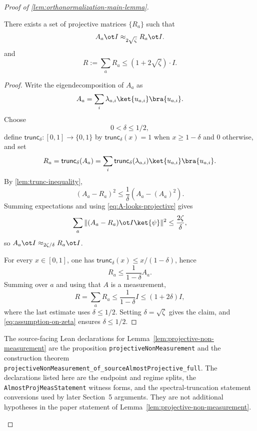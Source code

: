\begin{proof}[Proof of \ref{lem:orthonormalization-main-lemma}]
	\begin{lemma}\label{lem:projective-non-measurement}
		\leanok
		There exists a set of projective matrices $\{R_a\}$ such that
		\begin{equation*}
			A_a \ot I \approx_{2\sqrt{\zeta}} R_a \ot I.
		\end{equation*}
		and
		\begin{equation*}
			R:= \sum_a R_a \leq (1+2\sqrt{\zeta}) \cdot I.
		\end{equation*}
	\end{lemma}
	\begin{proof}
		\leanok
		Write the eigendecomposition of $A_a$ as
		\[
			A_a = \sum_i \lambda_{a,i}\ket{u_{a,i}}\bra{u_{a,i}}.
		\]
		Choose
		\begin{equation}\label{eq:bound-on-delta}
			0 < \delta \leq 1/2,
		\end{equation}
		define $\mathsf{trunc}_\delta:[0,1] \to \{0,1\}$ by $\mathsf{trunc}_\delta(x)=1$ when $x \geq 1-\delta$ and $0$ otherwise, and set
		\[
			R_a = \mathsf{trunc}_\delta(A_a)
			=
			\sum_i \mathsf{trunc}_\delta(\lambda_{a,i}) \ket{u_{a,i}}\bra{u_{a,i}}.
		\]
		By \ref{lem:trunc-inequality},
		\[
			(A_a-R_a)^2
			\leq
			\frac{1}{\delta}(A_a-(A_a)^2).
		\]
		Summing expectations and using \ref{eq:A-looks-projective} gives
		\[
			\sum_a \Vert (A_a-R_a)\ot I \ket{\psi}\Vert^2
			\leq
			\frac{2\zeta}{\delta},
		\]
		so $A_a \ot I \approx_{2\zeta/\delta} R_a \ot I$.

		For every $x \in [0,1]$, one has $\mathsf{trunc}_\delta(x) \leq x/(1-\delta)$, hence
		\[
			R_a \leq \frac{1}{1-\delta} A_a.
		\]
		Summing over $a$ and using that $A$ is a measurement,
		\[
			R = \sum_a R_a \leq \frac{1}{1-\delta} I \leq (1+2\delta)I,
		\]
		where the last estimate uses $\delta \leq 1/2$. Setting $\delta=\sqrt{\zeta}$ gives the claim, and \ref{eq:assumption-on-zeta} ensures $\delta \leq 1/2$.
	\end{proof}

	\begin{remark}\label{rem:lean-projective-non-measurement-auxiliary}
		The source-facing Lean declarations for
		Lemma~\ref{lem:projective-non-measurement} are the proposition
		\texttt{projectiveNonMeasurement} and the construction theorem
		\texttt{projectiveNonMeasurement\_of\_sourceAlmostProjective\_full}.
		The declarations listed here are the endpoint and regime splits, the
		\texttt{AlmostProjMeasStatement} witness forms, and the spectral-truncation
		statement conversions used by later Section~5 arguments.  They are not additional
		hypotheses in the paper statement of
		Lemma~\ref{lem:projective-non-measurement}.
	\end{remark}


\end{proof}
